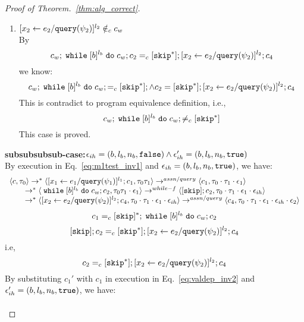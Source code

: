 \begin{proof}[Proof of Theorem.~\ref{thm:alg_correct}]
\begin{case}
\begin{subcase}
\begin{subsubcase}
\begin{subsubsubcase}
\begin{subproof}
\begin{enumerate}
  \[
    \forall z_i^{r_i} \in \lvar_{c_w}, x_j^{l_j} \in VAR(b) \st
    \flowsto(x_j^{l_j}, z_i^{r_i})
  \]
  Since $x_2^{l_2} \in \lvar_{c_w}$ by $\flowsto$ definition, we have: 
  \[
    \flowsto(x_1^{l_1}, x_2^{l_2})
  \]
  This case is proved.
 \item $[\mathrel{ {x}_2 \leftarrow e_2 / {\tt query}(\psi_2) }]^{l_2} \notin_c c_w$
 \\
 By
 \[
  c_w;\;\mathtt{while}\; [b]^{l_b} \;\mathtt{do}\; c_w; c_2 =_c [\mathtt{skip}^*]; [\mathrel{ {x}_2 \leftarrow e_2 / {\tt query}(\psi_2) }]^{l_2};{c}_4
\]
we know:
\[
  c_w;\;\mathtt{while}\; [b]^{l_b} \;\mathtt{do}\; c_w; =_c [\mathtt{skip}^*]; \land c_2 = [\mathtt{skip}^*]; [\mathrel{ {x}_2 \leftarrow e_2 / {\tt query}(\psi_2) }]^{l_2};{c}_4
\]
This is contradict to program equivalence definition, i.e.,
\[
  c_w;\;\mathtt{while}\; [b]^{l_b} \;\mathtt{do}\; c_w; \neq_c [\mathtt{skip}^*]
\]
This case is proved.
%
 \end{enumerate}
%
\textbf{subsubsubsub-case:}$\mathtt{\epsilon}_{ih} = (b, l_b, n_b, \mathtt{false}) \land \mathtt{\epsilon}_{ih}' = (b, l_b, n_b, \mathtt{true})$
\\
By execution in Eq.~\ref{eq:m1test_inv1} and $\mathtt{\epsilon}_{ih} = (b, l_b, n_b, \mathtt{true})$, we have:
\[
  \begin{array}{l}   
  \langle {c}, \mathtt{\tau}_0 \rangle \rightarrow^{*} 
  \langle [\mathrel{ {x}_1 \leftarrow e_1 / {\tt query}(\psi_1) }]^{l_1} ; {c}_1, \mathtt{\tau}_0 \mathtt{\tau}_1 \rangle  
  \rightarrow^{assn/query}
  \langle c_1, \mathtt{\tau}_0 \cdot \mathtt{\tau}_1 \cdot \mathtt{\epsilon}_1 \rangle 
  \\
  \qquad \rightarrow^{*} 
  \langle \;\mathtt{while}\; [b]^{l_b} \;\mathtt{do}\; c_w;{c}_2, 
  \mathtt{\tau}_0 \mathtt{\tau}_1 \cdot \mathtt{\epsilon}_1 \rangle 
  \rightarrow^{while-f} 
  \langle [\mathtt{skip}]; c_2, \mathtt{\tau}_0 \cdot \mathtt{\tau}_1 \cdot \mathtt{\epsilon}_1 \cdot \mathtt{\epsilon}_{ih} \rangle 
  \\
  \qquad \rightarrow^{*} 
  \langle [\mathrel{ {x}_2 \leftarrow e_2 / {\tt query}(\psi_2) }]^{l_2};{c}_4, 
  \mathtt{\tau}_0 \cdot \mathtt{\tau}_1 \cdot \mathtt{\epsilon}_1 \cdot \mathtt{\epsilon}_{ih} \rangle 
  \rightarrow^{assn/query} 
  \langle {c}_4,  \mathtt{\tau}_0 \cdot \mathtt{\tau}_1 \cdot \mathtt{\epsilon}_1 \cdot \mathtt{\epsilon}_{ih} \cdot \mathtt{\epsilon}_2 \rangle 
  \end{array}
\]
%
\[
  c_1 =_c [\mathtt{skip}]{}^*; \;\mathtt{while}\; [b]^{l_b} \;\mathtt{do}\; c_w;{c}_2
\]
% 
\[
  [\mathtt{skip}]; c_2 =_c [\mathtt{skip}^*];[\mathrel{ {x}_2 \leftarrow e_2 / {\tt query}(\psi_2) }]^{l_2};{c}_4
\]
i.e,
\[
  c_2 =_c [\mathtt{skip}^*];[\mathrel{ {x}_2 \leftarrow e_2 / {\tt query}(\psi_2) }]^{l_2};{c}_4
\]
%
By substituting $c_1'$ with $c_1$ in execution in Eq.~\ref{eq:valdep_inv2} and $\mathtt{\epsilon}_{ih}' = (b, l_b, n_b, \mathtt{true})$, we have:
  \begin{equation}
  \label{eq:m1testwhile_inv2}
  \begin{array}{l}   

\end{array}
\end{equation}
\end{subproof}
\end{subsubsubcase}
\end{subsubcase}
\end{subcase}
\end{case}
\end{proof}
